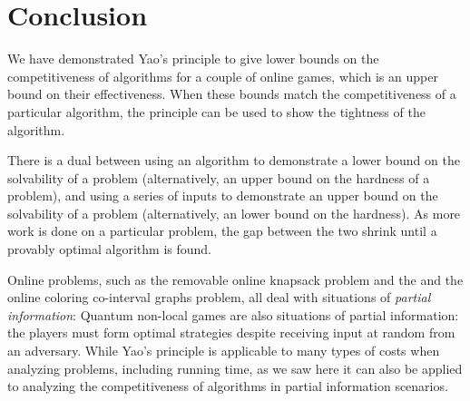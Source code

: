 \section{Conclusion}
We have demonstrated Yao's principle to give lower bounds on the competitiveness of algorithms for a couple of online games, which is an upper bound on their effectiveness. When these bounds match the competitiveness of a particular algorithm, the principle can be used to show the tightness of the algorithm.

There is a dual between using an algorithm to demonstrate a lower bound on the solvability of a problem (alternatively, an upper bound on the hardness of a problem), and using a series of inputs to demonstrate an upper bound on the solvability of a problem (alternatively, an lower bound on the hardness). As more work is done on a particular problem, the gap between the two shrink until a provably optimal algorithm is found.

Online problems, such as the removable online knapsack problem and the and the online coloring co-interval graphs problem, all deal with situations of \emph{partial information}: Quantum non-local games are also situations of partial information: the players must form optimal strategies despite receiving input at random from an adversary. While Yao's principle is applicable to many types of costs when analyzing problems, including running time, as we saw here it can also be applied to analyzing the competitiveness of algorithms in partial information scenarios.
